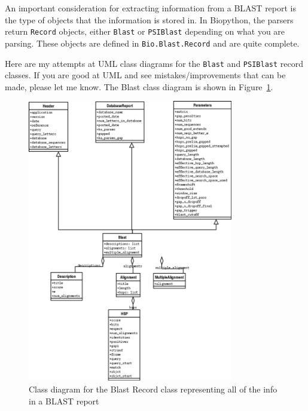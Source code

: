 \documentclass{report}
\begin{document}
An important consideration for extracting information from a BLAST report is the type of objects that the information is stored in. In Biopython, the parsers return \verb|Record| objects, either \verb|Blast| or \verb|PSIBlast| depending on what you are parsing. These objects are defined in \verb|Bio.Blast.Record| and are quite complete.


Here are my attempts at UML class diagrams for the \verb|Blast| and \verb|PSIBlast| record classes. If you are good at UML and see mistakes/improvements that can be made, please let me know. The Blast class diagram is shown in Figure~\ref{fig:blastrecord}.

\begin{htmlonly}
\label{fig:blastrecord}
\end{htmlonly}

\begin{latexonly}
\begin{figure}[htbp]
\centering
\includegraphics[width=0.8\textwidth]{images/BlastRecord.png}
\caption{Class diagram for the Blast Record class representing all of the info in a BLAST report}
\label{fig:blastrecord}
\end{figure}
\end{latexonly}
\end{document}
